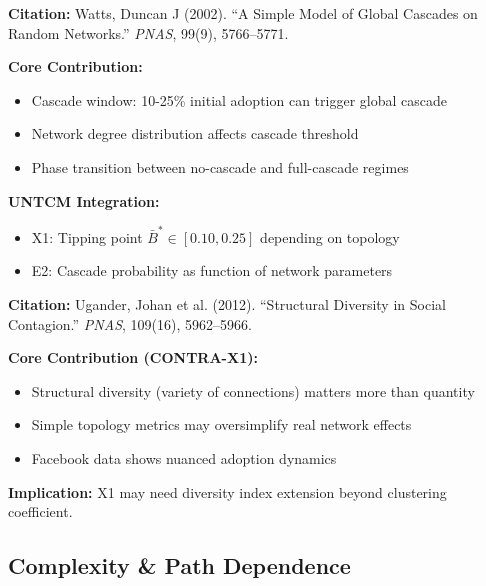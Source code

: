 \begin{tcolorbox}[colback=yellow!5!white,colframe=yellow!75!black,title=Key Paper: Watts (2002)]
\textbf{Citation:} Watts, Duncan J (2002). ``A Simple Model of Global Cascades on Random Networks.'' \textit{PNAS}, 99(9), 5766--5771.

\textbf{Core Contribution:}
\begin{itemize}[nosep]
    \item Cascade window: 10-25\% initial adoption can trigger global cascade
    \item Network degree distribution affects cascade threshold
    \item Phase transition between no-cascade and full-cascade regimes
\end{itemize}

\textbf{UNTCM Integration:}
\begin{itemize}[nosep]
    \item X1: Tipping point $\bar{B}^* \in [0.10, 0.25]$ depending on topology
    \item E2: Cascade probability as function of network parameters
\end{itemize}
\end{tcolorbox}

\begin{tcolorbox}[colback=orange!5!white,colframe=orange!75!black,title=CONTRA Paper: Ugander et al. (2012)]
\textbf{Citation:} Ugander, Johan et al. (2012). ``Structural Diversity in Social Contagion.'' \textit{PNAS}, 109(16), 5962--5966.

\textbf{Core Contribution (CONTRA-X1):}
\begin{itemize}[nosep]
    \item Structural diversity (variety of connections) matters more than quantity
    \item Simple topology metrics may oversimplify real network effects
    \item Facebook data shows nuanced adoption dynamics
\end{itemize}

\textbf{Implication:} X1 may need diversity index extension beyond clustering coefficient.
\end{tcolorbox}

\subsection{Complexity \& Path Dependence}
\label{subsec:ot-complexity}


